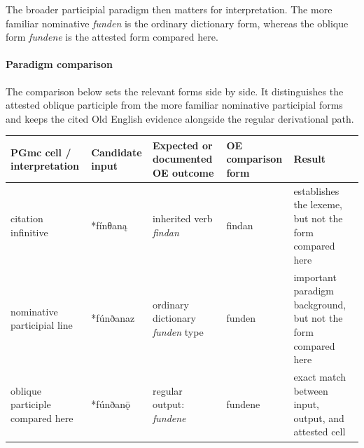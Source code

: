 \documentclass[
  british,
  a4paper,
]{article}
\newcounter{none} %
\begin{document}
The broader participial paradigm then matters for interpretation. The
more familiar nominative \emph{funden} is the ordinary dictionary form,
whereas the oblique form \emph{fundene} is the attested form compared
here.

\paragraph{Paradigm comparison}\label{paradigm-comparison-4}

The comparison below sets the relevant forms side by side. It
distinguishes the attested oblique participle from the more familiar
nominative participial forms and keeps the cited Old English evidence
alongside the regular derivational path.

{\def\LTcaptype{none} %
\begin{longtable}[]{@{}
  >{\raggedright\arraybackslash}p{}
  >{\raggedright\arraybackslash}p{}
  >{\raggedright\arraybackslash}p{}
  >{\raggedright\arraybackslash}p{}
  >{\raggedright\arraybackslash}p{}@{}}
\toprule\noalign{}
\begin{minipage}[b]{\linewidth}\raggedright
PGmc cell / interpretation
\end{minipage} & \begin{minipage}[b]{\linewidth}\raggedright
Candidate input
\end{minipage} & \begin{minipage}[b]{\linewidth}\raggedright
Expected or documented OE outcome
\end{minipage} & \begin{minipage}[b]{\linewidth}\raggedright
OE comparison form
\end{minipage} & \begin{minipage}[b]{\linewidth}\raggedright
Result
\end{minipage} \\
\midrule\noalign{}
\endhead
\bottomrule\noalign{}
\endlastfoot
citation infinitive & *fínθaną & inherited verb \emph{findan} & findan &
establishes the lexeme, but not the form compared here \\
nominative participial line & *fúnðanaz & ordinary dictionary
\emph{funden} type & funden & important paradigm background, but not the
form compared here \\
oblique participle compared here & *fúnðanǭ & regular output:
\emph{fundene} & fundene & exact match between input, output, and
attested cell \\
\end{longtable}
}
\end{document}
